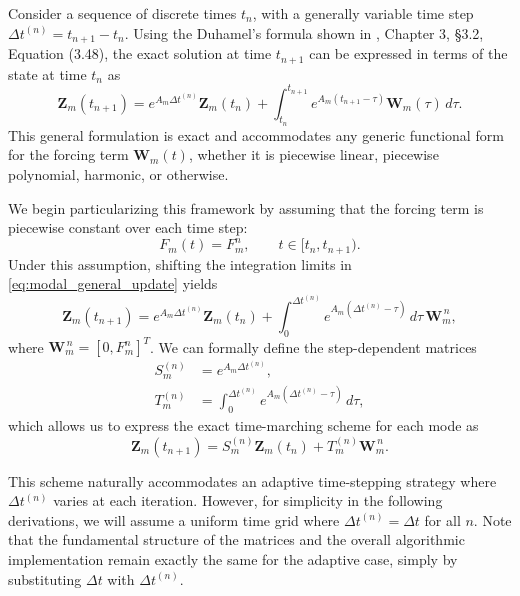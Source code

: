\documentclass{Configuration_Files/PoliMi3i_thesis}
\begin{document}
Consider a sequence of discrete times $t_n$, with a generally variable time step $\Delta t^{(n)} = t_{n+1} - t_n$. Using the Duhamel's formula shown in \cite{teschl_ordinary_2012}, Chapter 3, §3.2, Equation (3.48), the exact solution at time $t_{n+1}$ can be expressed in terms of the state at time $t_n$ as
\begin{equation} \label{eq:modal_general_update}
\mathbf Z_m(t_{n+1})
=
e^{A_m\Delta t^{(n)}}
\mathbf Z_m(t_n)
+
\int_{t_n}^{t_{n+1}}
e^{A_m(t_{n+1}-\tau)}
\mathbf W_m(\tau)
\,d\tau.
\end{equation}
This general formulation is exact and accommodates any generic functional form for the forcing term $\mathbf W_m(t)$, whether it is piecewise linear, piecewise polynomial, harmonic, or otherwise.

We begin particularizing this framework by assuming that the forcing term is piecewise constant over each time step:
\begin{equation*}
F_m(t)=F_m^n,
\qquad
t\in[t_n,t_{n+1}).
\end{equation*}
Under this assumption, shifting the integration limits in \eqref{eq:modal_general_update} yields
\begin{equation*}
\mathbf Z_m(t_{n+1})
=
e^{A_m\Delta t^{(n)}}
\mathbf Z_m(t_n)
+
\int_0^{\Delta t^{(n)}}
e^{A_m(\Delta t^{(n)}-\tau)}
\,d\tau\,
\mathbf W_m^{\,n},
\end{equation*}
where $\mathbf W_m^{\,n} = [0, F_m^n]^T$. We can formally define the step-dependent matrices
\begin{align*}
S_m^{(n)}
&=
e^{A_m\Delta t^{(n)}}, 
\\
T_m^{(n)}
&=
\int_0^{\Delta t^{(n)}}
e^{A_m(\Delta t^{(n)}-\tau)}
\,d\tau, 
\end{align*}
which allows us to express the exact time-marching scheme for each mode as
\begin{equation} \label{eq:modal_update_variable}
\mathbf Z_m(t_{n+1})
=
S_m^{(n)}
\mathbf Z_m(t_n)
+
T_m^{(n)}
\mathbf W_m^{\,n}.
\end{equation}

This scheme naturally accommodates an adaptive time-stepping strategy where $\Delta t^{(n)}$ varies at each iteration. However, for simplicity in the following derivations, we will assume a uniform time grid where $\Delta t^{(n)} = \Delta t$ for all $n$. Note that the fundamental structure of the matrices and the overall algorithmic implementation remain exactly the same for the adaptive case, simply by substituting $\Delta t$ with $\Delta t^{(n)}$.
\end{document}
